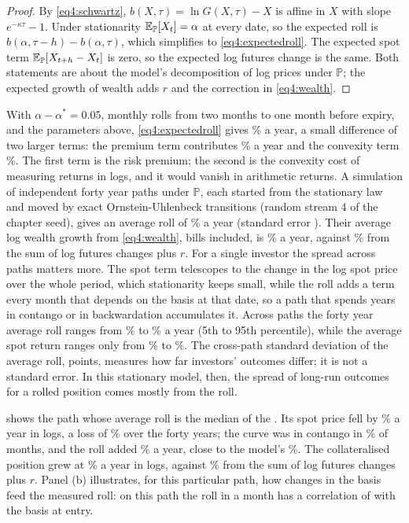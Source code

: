 \begin{chapterrefs}
\begin{proof}
By \cref{eq4:schwartz}, $b(X,\tau)=\ln G(X,\tau)-X$ is affine in $X$ with slope $e^{-\kappa\tau}-1$.
Under stationarity $\mathbb{E}_{\mathbb P}[X_t]=\alpha$ at every date, so the expected roll is
$b(\alpha,\tau-h)-b(\alpha,\tau)$, which simplifies to \cref{eq4:expectedroll}. The expected spot term
$\mathbb{E}_{\mathbb P}[X_{t+h}-X_t]$ is zero, so the expected log futures change is the same. Both statements are about
the model's decomposition of log prices under $\mathbb P$; the expected growth of wealth adds $r$ and the
correction in \cref{eq4:wealth}.
\end{proof}

With $\alpha-\alpha^*=0.05$, monthly rolls from two months to one month before expiry, and the
parameters above, \cref{eq4:expectedroll} gives \rollTheory\% a year, a small difference of two larger terms: the premium term contributes
\rollPremTerm\% a year and the convexity term \rollConvTerm\%. The first term is the risk
premium; the second is the convexity cost of measuring returns in logs, and it would vanish in
arithmetic returns. A simulation of \rollPaths{} independent forty year paths under $\mathbb P$, each started
from the stationary law and moved by exact Ornstein-Uhlenbeck transitions (random stream 4 of the
chapter seed), gives an average roll of \rollMCMean\% a year (standard error \rollMCSE). Their
average log wealth growth from \cref{eq4:wealth}, bills included, is \rollWealthMean\% a year, against
\rollApproxMean\% from the sum of log futures changes plus $r$. For a single investor the spread across paths matters more. The spot term telescopes to the change
in the log spot price over the whole period, which stationarity keeps small, while the roll adds a
term every month that depends on the basis at that date, so a path that spends years in contango or
in backwardation accumulates it. Across paths the forty year average roll ranges from \rollMCLo\% to
\rollMCHi\% a year (5th to 95th percentile), while the average
spot return ranges only from \rollMCSpotLo\% to \rollMCSpotHi\%. The cross-path standard deviation of the average roll, \rollMCSd{} points,
measures how far investors' outcomes differ; it is not a standard error. In this stationary model, then, the spread of long-run outcomes for a
rolled position comes mostly from the roll.

 shows the path whose average roll is the median of the \rollPaths. Its spot price
fell by \rollSpotAnnAbs\% a year in logs, a loss of \rollSpotFortyFall\% over the forty years; the curve was in contango in \rollContango\% of
months, and the roll added \rollRollAnn\% a year, close to the model's \rollTheory\%. The
collateralised position grew at \rollWealthAnn\% a year in logs, against \rollTotalAnn\% from the sum
of log futures changes plus $r$. Panel (b) illustrates, for this particular path, how changes in the basis feed the measured roll: on this path the roll
in a month has a correlation of \rollBasisCorr{} with the basis at entry.


\end{chapterrefs}
